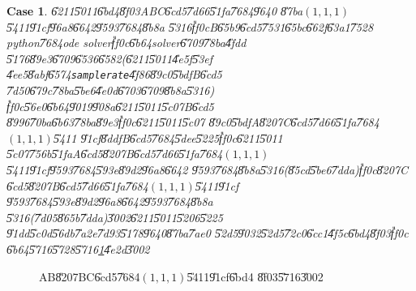 \documentclass[12pt,a4paper]{article}
\newtheorem{case}[theorem]{Case}
\begin{document}
\begin{case}
\U{6211}\U{5011}\U{6bd4}\U{8f03}ABC\U{6cd5}\U{7d66}\U{51fa}\U{7684}\U{9640}%
\U{87ba}$(1,1,1)$\U{5411}\U{91cf}\U{96a8}\U{6642}\U{9593}\U{7684}\U{8b8a}%
\U{5316}\U{ff0c}B\U{65b9}\U{6cd5}\U{7531}\U{65bc}\U{662f}\U{63a1}\U{7528}%
python\U{7684}ode solver\U{ff0c}\U{6b64}solver\U{6709}\U{78ba}\U{4fdd}%
\U{5176}\U{89e3}\U{6709}\U{6536}\U{6582}(\U{6211}\U{5011}\U{4e5f}\U{53ef}%
\U{4ee5}\U{8abf}\U{6574}\texttt{samplerate}\U{4f86}\U{89c0}\U{5bdf}B\U{6cd5}%
\U{7d50}\U{679c}\U{78ba}\U{5be6}\U{4e0d}\U{6703}\U{6709}\U{8b8a}\U{5316})%
\U{ff0c}\U{56e0}\U{6b64}\U{9019}\U{908a}\U{6211}\U{5011}\U{5c07}B\U{6cd5}%
\U{8996}\U{70ba}\U{6b63}\U{78ba}\U{89e3}\U{ff0c}\U{6211}\U{5011}\U{5c07}%
\U{89c0}\U{5bdf}A\U{8207}C\U{6cd5}\U{7d66}\U{51fa}\U{7684}$(1,1,1)$\U{5411}%
\U{91cf}\U{8ddf}B\U{6cd5}\U{7684}\U{5dee}\U{5225}\U{ff0c}\U{6211}\U{5011}%
\U{5c07}\U{756b}\U{51fa}A\U{6cd5}\U{8207}B\U{6cd5}\U{7d66}\U{51fa}\U{7684}$%
(1,1,1)$\U{5411}\U{91cf}\U{9593}\U{7684}\U{593e}\U{89d2}\U{96a8}\U{6642}%
\U{9593}\U{7684}\U{8b8a}\U{5316}(\U{85cd}\U{5be6}\U{7dda})\U{ff0c}\U{8207}C%
\U{6cd5}\U{8207}B\U{6cd5}\U{7d66}\U{51fa}\U{7684}$(1,1,1)$\U{5411}\U{91cf}%
\U{9593}\U{7684}\U{593e}\U{89d2}\U{96a8}\U{6642}\U{9593}\U{7684}\U{8b8a}%
\U{5316}(\U{7d05}\U{865b}\U{7dda})\U{3002}\U{6211}\U{5011}\U{5206}\U{5225}%
\U{91dd}\U{5c0d}\U{56db}\U{7a2e}\U{7d93}\U{5178}\U{9640}\U{87ba}\U{7ae0}%
\U{52d5}\U{9032}\U{52d5}\U{72c0}\U{6cc1}\U{4f5c}\U{6bd4}\U{8f03}\U{ff0c}%
\U{6b64}\U{5716}\U{5728}\U{5716}\ref{ABCcompareFig}\U{4e2d}\U{3002}
\end{case}

\begin{figure}[th]
\caption{AB\U{8207}BC\U{6cd5}\U{7684}$(1,1,1)$\U{5411}\U{91cf}\U{6bd4}%
\U{8f03}\U{5716}\U{3002}}
\label{ABCcompareFig}
\begin{center}

\end{center}
\end{figure}
\end{document}
